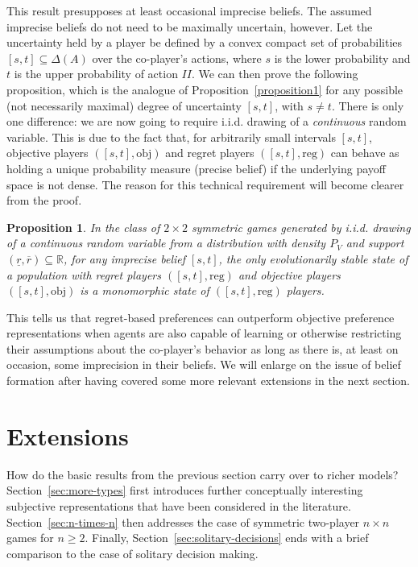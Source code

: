 \documentclass[fleqn,reqno,12pt]{article}
\theoremstyle{Satz}
\newtheorem{proposition}{Proposition}
\theoremstyle{Bsp}
\begin{document}
This result presupposes at least occasional imprecise beliefs. The assumed imprecise beliefs do not need to be maximally uncertain, however.  Let
the uncertainty held by a player be defined by a convex compact set of probabilities
$ [s,t] \subseteq \Delta(A) $ over the co-player's actions, where $s$ is the lower probability
and $t$ is the upper probability of action $II$.  We can then prove the following proposition,
which is the analogue of Proposition~\ref{proposition1} for any possible (not necessarily
maximal) degree of uncertainty $[s,t]$, with $s \neq t$. There is only one difference: we are
now going to require i.i.d. drawing of a \emph{continuous} random variable. This is due to the
fact that, for arbitrarily small intervals $[s,t]$, objective players $([s,t],\text{obj})$ and
regret players $([s,t],\text{reg})$ can behave as holding a unique probability measure (precise
belief) if the underlying payoff space is not dense. The reason for this technical requirement
will become clearer from the proof.

\begin{proposition} \label{proposition2} In the class of $2\times2$ symmetric games generated
  by i.i.d. drawing of a continuous random variable from a distribution with density $P_V$ and
  support $(\underline{r},\overline{r}) \subseteq \mathbb{R}$, for any imprecise
  belief $[s,t]$, the only evolutionarily stable state of a population with regret players
  $([s,t],\text{reg})$ and objective players $([s,t],\text{obj})$ is a monomorphic state of
  $([s,t],\text{reg})$ players.
\end{proposition}

This tells us that regret-based preferences can outperform objective preference
representations when agents are also capable of learning or otherwise restricting their assumptions
about the co-player's behavior as long as there is, at least on occasion, some imprecision in
their beliefs. We will enlarge on the issue of belief formation after having covered some more
relevant extensions in the next section.

\section{Extensions}
\label{sec:extensions}

How do the basic results from the previous section carry over to richer models?
Section~\ref{sec:more-types} first introduces further conceptually interesting subjective
representations that have been considered in the literature. Section~\ref{sec:n-times-n} then
addresses the case of symmetric two-player $n \times n$ games for $n \ge 2$. Finally,
Section~\ref{sec:solitary-decisions} ends with a brief comparison to the case of solitary
decision making.
\end{document}
